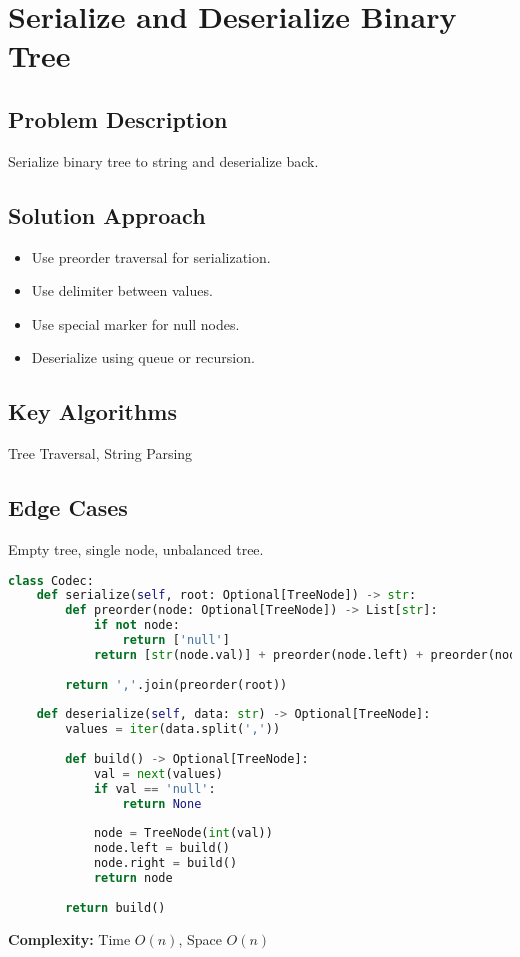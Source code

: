 \documentclass[10pt, a4paper]{article}
\begin{document}
\section{Serialize and Deserialize Binary Tree}
\subsection*{Problem Description}
Serialize binary tree to string and deserialize back.

\subsection*{Solution Approach}
\begin{itemize}
    \item Use preorder traversal for serialization.
    \item Use delimiter between values.
    \item Use special marker for null nodes.
    \item Deserialize using queue or recursion.
\end{itemize}

\subsection*{Key Algorithms}
Tree Traversal, String Parsing

\subsection*{Edge Cases}
Empty tree, single node, unbalanced tree.

\begin{lstlisting}[language=Python]
class Codec:
    def serialize(self, root: Optional[TreeNode]) -> str:
        def preorder(node: Optional[TreeNode]) -> List[str]:
            if not node:
                return ['null']
            return [str(node.val)] + preorder(node.left) + preorder(node.right)
        
        return ','.join(preorder(root))
    
    def deserialize(self, data: str) -> Optional[TreeNode]:
        values = iter(data.split(','))
        
        def build() -> Optional[TreeNode]:
            val = next(values)
            if val == 'null':
                return None
            
            node = TreeNode(int(val))
            node.left = build()
            node.right = build()
            return node
        
        return build()
\end{lstlisting}
\textbf{Complexity:} Time $O(n)$, Space $O(n)$
\end{document}
